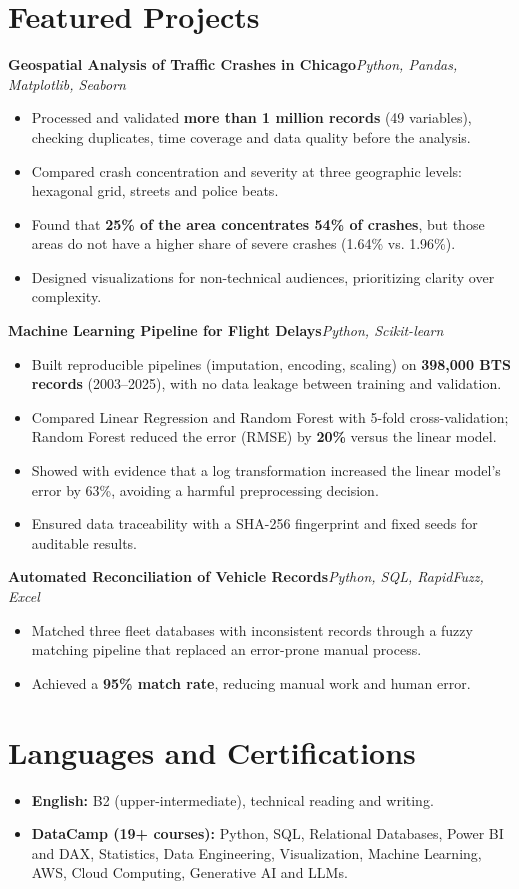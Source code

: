 \documentclass[10pt]{article}
\newcommand{\project}[2]{\textbf{#1}\hfill\textit{#2}\par}
\begin{document}
\section*{Featured Projects}
\project{Geospatial Analysis of Traffic Crashes in Chicago}{Python, Pandas, Matplotlib, Seaborn}
\begin{itemize}
\item Processed and validated \textbf{more than 1 million records} (49 variables), checking duplicates, time coverage and data quality before the analysis.
\item Compared crash concentration and severity at three geographic levels: hexagonal grid, streets and police beats.
\item Found that \textbf{25\% of the area concentrates 54\% of crashes}, but those areas do not have a higher share of severe crashes (1.64\% vs. 1.96\%).
\item Designed visualizations for non-technical audiences, prioritizing clarity over complexity.
\end{itemize}
\vspace{5pt}
\project{Machine Learning Pipeline for Flight Delays}{Python, Scikit-learn}
\begin{itemize}
\item Built reproducible pipelines (imputation, encoding, scaling) on \textbf{398,000 BTS records} (2003--2025), with no data leakage between training and validation.
\item Compared Linear Regression and Random Forest with 5-fold cross-validation; Random Forest reduced the error (RMSE) by \textbf{20\%} versus the linear model.
\item Showed with evidence that a log transformation increased the linear model's error by 63\%, avoiding a harmful preprocessing decision.
\item Ensured data traceability with a SHA-256 fingerprint and fixed seeds for auditable results.
\end{itemize}
\vspace{5pt}
\project{Automated Reconciliation of Vehicle Records}{Python, SQL, RapidFuzz, Excel}
\begin{itemize}
\item Matched three fleet databases with inconsistent records through a fuzzy matching pipeline that replaced an error-prone manual process.
\item Achieved a \textbf{95\% match rate}, reducing manual work and human error.
\end{itemize}

\section*{Languages and Certifications}
\begin{itemize}
\item \textbf{English:} B2 (upper-intermediate), technical reading and writing.
\item \textbf{DataCamp (19+ courses):} Python, SQL, Relational Databases, Power BI and DAX, Statistics, Data Engineering, Visualization, Machine Learning, AWS, Cloud Computing, Generative AI and LLMs.
\end{itemize}
\end{document}

